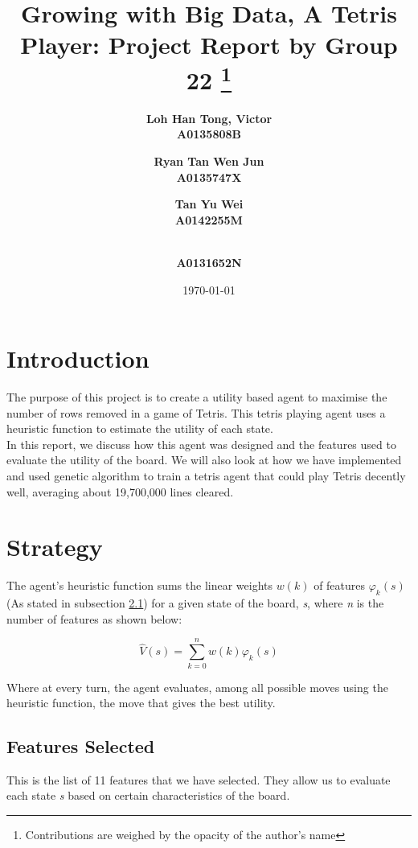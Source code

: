 \documentclass[a4paper,12pt,twocolumn]{article}
\begin{document}
\setlength{\parindent}{0pt}

\title{Growing with Big Data, A Tetris Player: Project Report by Group 22 
\footnote{Contributions are weighed by the opacity of the author's name}}
\author{\bf{Loh Han Tong, Victor} \\ A0135808B
    \and \bf{Ryan Tan Wen Jun} \\ A0135747X \and \bf {Tan Yu Wei} \\ A0142255M
    \and \bf{} \\ A0131652N
}
\date{\today}
\maketitle

\section{Introduction}
The purpose of this project is to create a utility based agent to maximise the
number of rows removed in a game of Tetris. This tetris playing agent uses a heuristic
function to estimate the utility of each state.\\

In this report, we discuss how this agent was designed and the features used to
evaluate the utility of the board. We will also look at how we have implemented
and used genetic algorithm to train a tetris agent that could play Tetris decently well,
averaging about 19,700,000 lines cleared.

\section{Strategy}
The agent's heuristic function sums the linear weights $w(k)$ of features $\varphi_k(s)$
(As stated in subsection \ref{features_subsection}) for a given state of the board,
\textit{s}, where \textit{n} is the number of features as shown below:

\[
    \hat V(s) = \sum_{k=0}^{n}w(k)\varphi_k(s)
\]

Where at every turn, the agent evaluates, among all possible moves using the
heuristic function, the move that gives the best utility.

\subsection{Features Selected}
\label{features_subsection}
This is the list of 11 features that we have selected. They allow us to
evaluate each state \textit{s} based on certain characteristics of the board.\\
\end{document}
